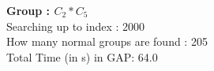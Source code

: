 \textbf{Group : $C_2*C_5$}\\
Searching up to index : 2000\\
How many normal groups are found : 205\\
Total Time (in s) in GAP: 64.0\\
